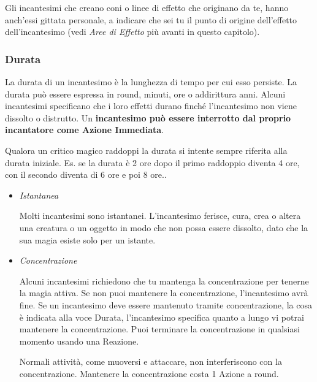\begin{multicols}{2}
Gli incantesimi che creano coni o linee di effetto che originano da te, hanno anch'essi gittata personale, a indicare che sei tu il punto di origine dell'effetto dell'incantesimo (vedi \emph{Aree di Effetto} più avanti in questo capitolo).

\subsubsection{Durata}\label{magiedurata}\hypertarget{magiedurata}{}

La durata di un incantesimo è la lunghezza di tempo per cui esso persiste. La durata può essere espressa in round, minuti, ore o addirittura anni. Alcuni incantesimi specificano che i loro effetti durano finché l'incantesimo non viene dissolto o distrutto. Un \textbf{incantesimo può essere interrotto dal proprio incantatore come Azione Immediata}.

Qualora un critico magico raddoppi la durata si intente sempre riferita alla durata iniziale. Es. se la durata è 2 ore dopo il primo raddoppio diventa 4 ore, con il secondo diventa di 6 ore e poi 8 ore..

\begin{itemize}[leftmargin=*] \setlength{\itemsep}{0pt}

\item
\emph{Istantanea}

Molti incantesimi sono istantanei. L'incantesimo ferisce, cura, crea o altera una creatura o un oggetto in modo che non possa essere dissolto, dato che la sua magia esiste solo per un istante.

\item

\emph{Concentrazione}

Alcuni incantesimi richiedono che tu mantenga la concentrazione per tenerne la magia attiva. Se non puoi mantenere la concentrazione, l'incantesimo avrà fine. Se un incantesimo deve essere mantenuto tramite concentrazione, la cosa è indicata alla voce Durata, l'incantesimo specifica quanto a lungo vi potrai mantenere la concentrazione. Puoi terminare la concentrazione in qualsiasi momento usando una Reazione.

Normali attività, come muoversi e attaccare, non interferiscono con la concentrazione. Mantenere la concentrazione costa 1 Azione a round.
\end{itemize}


\end{multicols}
